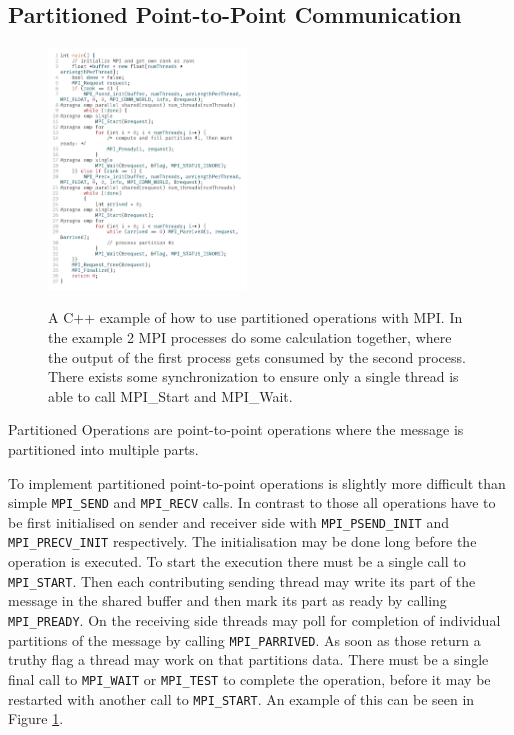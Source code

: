 \documentclass[sigconf]{acmart}
\begin{document}
\subsection{Partitioned Point-to-Point Communication}

\begin{figure}
    \caption{
        A C++ example of how to use partitioned operations with MPI.
        In the example 2 MPI processes do some calculation together, where the output of the first process gets consumed by the second process.
        There exists some synchronization to ensure only a single thread is able to call MPI\_Start and MPI\_Wait.
    }
    \includegraphics[width=0.47\textwidth]{PartitionOperations_CPP.png}
    \label{fig:PartitionedOps_CPP}
\end{figure}

Partitioned Operations are point-to-point operations where the message is partitioned into multiple parts.

To implement partitioned point-to-point operations is slightly more difficult than simple \verb|MPI_SEND| and \verb|MPI_RECV| calls.
In contrast to those all operations have to be first initialised on sender and receiver side with \verb|MPI_PSEND_INIT| and \verb|MPI_PRECV_INIT| respectively.
The initialisation may be done long before the operation is executed.
To start the execution there must be a single call to \verb|MPI_START|.
Then each contributing sending thread may write its part of the message in the shared buffer and then mark its part as ready by calling \verb|MPI_PREADY|.
On the receiving side threads may poll for completion of individual partitions of the message by calling \verb|MPI_PARRIVED|.
As soon as those return a truthy flag a thread may work on that partitions data.
There must be a single final call to \verb|MPI_WAIT| or \verb|MPI_TEST| to complete the operation, before it may be restarted with another call to \verb|MPI_START|.
An example of this can be seen in Figure \ref{fig:PartitionedOps_CPP}.
\end{document}
